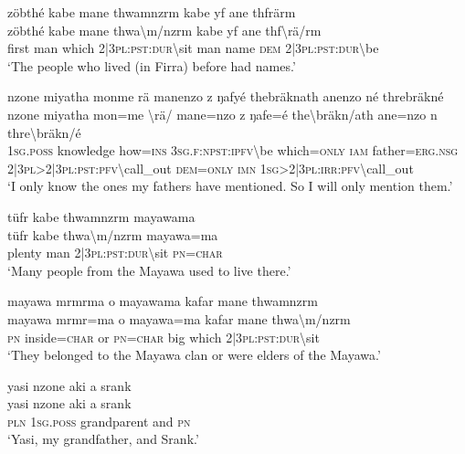 \ea\label{ex:4:a1640}
zöbthé kabe mane thwamnzrm kabe yf ane thfrärm\\
\gll zöbthé	kabe	mane	thwa{\textbackslash}m/nzrm	kabe	yf	ane	thf{\textbackslash}rä/rm\\
     first	man	which	2|3\textsc{pl}:\textsc{pst}:\textsc{dur}{\textbackslash}sit	man	name	\textsc{dem}	2|3\textsc{pl}:\textsc{pst}:\textsc{dur}{\textbackslash}be\\
\glt `The people who lived (in Firra) before had names.'
\z

\ea\label{ex:4:a1643}
nzone miyatha monme rä manenzo z ŋafyé thebräknath anenzo né threbräkné\\
\gll nzone	miyatha	mon=me	{\textbackslash}rä/	mane=nzo	z	ŋafe=é	the{\textbackslash}bräkn/ath	ane=nzo	n	thre{\textbackslash}bräkn/é\\
     1\textsc{sg}.\textsc{poss}	knowledge	how=\textsc{ins}	3\textsc{sg}.\textsc{f}:\textsc{npst}:\textsc{ipfv}{\textbackslash}be	which=\textsc{only}	\textsc{iam}	father=\textsc{erg}.\textsc{nsg}	2|3\textsc{pl}>2|3\textsc{pl}:\textsc{pst}:\textsc{pfv}{\textbackslash}call\_out	\textsc{dem}=\textsc{only}	\textsc{imn}	1\textsc{sg}>2|3\textsc{pl}:\textsc{irr}:\textsc{pfv}{\textbackslash}call\_out\\
\glt `I only know the ones my fathers have mentioned. So I will only mention them.'
\z

\ea\label{ex:4:a1644}
tüfr kabe thwamnzrm mayawama\\
\gll tüfr	kabe	thwa{\textbackslash}m/nzrm	mayawa=ma\\
     plenty	man	2|3\textsc{pl}:\textsc{pst}:\textsc{dur}{\textbackslash}sit	\textsc{pn}=\textsc{char}\\
\glt `Many people from the Mayawa used to live there.'
\z

\ea\label{ex:4:a1646}
mayawa mrmrma o mayawama kafar mane thwamnzrm\\
\gll mayawa	mrmr=ma	o	mayawa=ma	kafar	mane	thwa{\textbackslash}m/nzrm\\
     \textsc{pn}	inside=\textsc{char}	or	\textsc{pn}=\textsc{char}	big	which	2|3\textsc{pl}:\textsc{pst}:\textsc{dur}{\textbackslash}sit\\
\glt `They belonged to the Mayawa clan or were elders of the Mayawa.'
\z

\ea\label{ex:4:a1647}
yasi nzone aki a srank\\
\gll yasi	nzone	aki	a	srank\\
     \textsc{pln}	1\textsc{sg}.\textsc{poss}	grandparent	and	\textsc{pn}\\
\glt `Yasi, my grandfather, and Srank.'
\z

